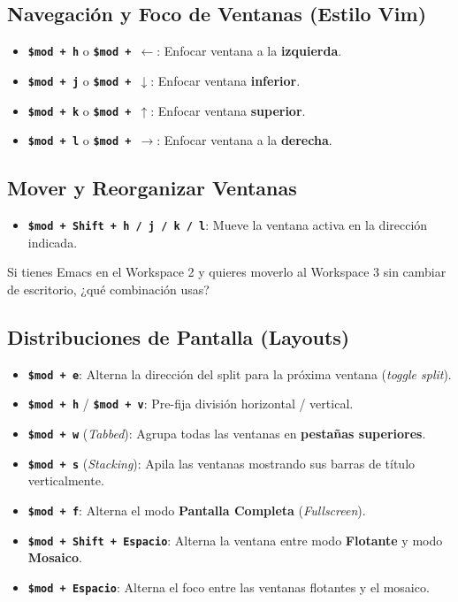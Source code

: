 \documentclass[11pt,article,spanish]{apuntes-scr}
\begin{document}
\subsection{Navegación y Foco de Ventanas (Estilo Vim)}
\begin{itemize}[leftmargin=*]
    \item \textbf{\texttt{\$mod + h}} o \textbf{\texttt{\$mod + $\leftarrow$}}: Enfocar ventana a la \textbf{izquierda}.
    \item \textbf{\texttt{\$mod + j}} o \textbf{\texttt{\$mod + $\downarrow$}}: Enfocar ventana \textbf{inferior}.
    \item \textbf{\texttt{\$mod + k}} o \textbf{\texttt{\$mod + $\uparrow$}}: Enfocar ventana \textbf{superior}.
    \item \textbf{\texttt{\$mod + l}} o \textbf{\texttt{\$mod + $\rightarrow$}}: Enfocar ventana a la \textbf{derecha}.
\end{itemize}

\subsection{Mover y Reorganizar Ventanas}
\begin{itemize}[leftmargin=*]
    \item \textbf{\texttt{\$mod + Shift + h / j / k / l}}: Mueve la ventana activa en la dirección indicada.
\end{itemize}

\begin{controlbox}[Autoevaluación]
  Si tienes Emacs en el Workspace 2 y quieres moverlo al Workspace 3 sin cambiar de escritorio, ¿qué combinación usas?
\end{controlbox}

\subsection{Distribuciones de Pantalla (Layouts)}
\begin{itemize}[leftmargin=*]
    \item \textbf{\texttt{\$mod + e}}: Alterna la dirección del split para la próxima ventana (\textit{toggle split}).
    \item \textbf{\texttt{\$mod + h}} / \textbf{\texttt{\$mod + v}}: Pre-fija división horizontal / vertical.
    \item \textbf{\texttt{\$mod + w}} (\textit{Tabbed}): Agrupa todas las ventanas en \textbf{pestañas superiores}.
    \item \textbf{\texttt{\$mod + s}} (\textit{Stacking}): Apila las ventanas mostrando sus barras de título verticalmente.
    \item \textbf{\texttt{\$mod + f}}: Alterna el modo \textbf{Pantalla Completa} (\textit{Fullscreen}).
    \item \textbf{\texttt{\$mod + Shift + Espacio}}: Alterna la ventana entre modo \textbf{Flotante} y modo \textbf{Mosaico}.
    \item \textbf{\texttt{\$mod + Espacio}}: Alterna el foco entre las ventanas flotantes y el mosaico.
\end{itemize}
\end{document}
